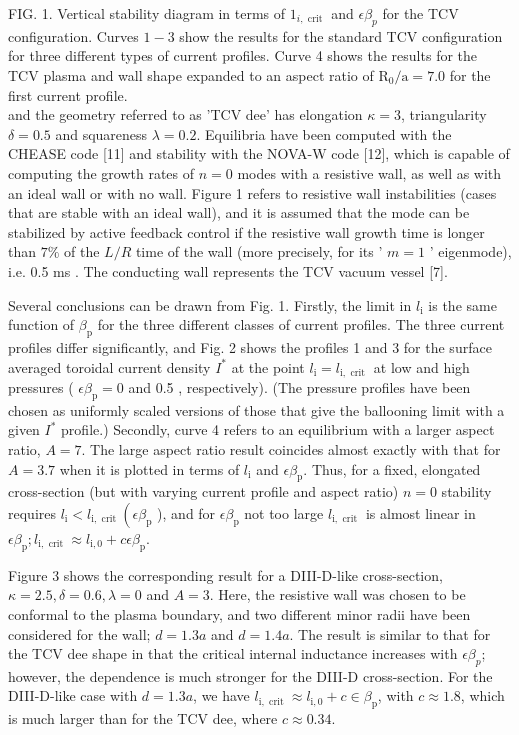 \documentclass[10pt]{article}
\begin{document}
FIG. 1. Vertical stability diagram in terms of $1_{i, \text { crit }}$ and $\epsilon \beta_{p}$ for the TCV configuration. Curves $1-3$ show the results for the standard TCV configuration for three different types of current profiles. Curve 4 shows the results for the TCV plasma and wall shape expanded to an aspect ratio of $\mathrm{R}_{0} / \mathrm{a}=7.0$ for the first current profile.\\
and the geometry referred to as 'TCV dee' has elongation $\kappa=3$, triangularity $\delta=0.5$ and squareness $\lambda=0.2$. Equilibria have been computed with the CHEASE code [11] and stability with the NOVA-W code [12], which is capable of computing the growth rates of $n=0$ modes with a resistive wall, as well as with an ideal wall or with no wall. Figure 1 refers to resistive wall instabilities (cases that are stable with an ideal wall), and it is assumed that the mode can be stabilized by active feedback control if the resistive wall growth time is longer than $7 \%$ of the $L / R$ time of the wall (more precisely, for its ' $m=1$ ' eigenmode), i.e. 0.5 ms . The conducting wall represents the TCV vacuum vessel [7].

Several conclusions can be drawn from Fig. 1. Firstly, the limit in $l_{\mathrm{i}}$ is the same function of $\beta_{\mathrm{p}}$ for the three different classes of current profiles. The three current profiles differ significantly, and Fig. 2 shows the profiles 1 and 3 for the surface averaged toroidal current density $I^{*}$ at the point $l_{\mathrm{i}}=l_{\mathrm{i}, \text { crit }}$ at low and high pressures ( $\epsilon \beta_{\mathrm{p}}=0$ and 0.5 , respectively). (The pressure profiles have been chosen as uniformly scaled versions of those that give the ballooning limit with a\\
given $I^{*}$ profile.) Secondly, curve 4 refers to an equilibrium with a larger aspect ratio, $A=7$. The large aspect ratio result coincides almost exactly with that for $A=3.7$ when it is plotted in terms of $l_{\mathrm{i}}$ and $\epsilon \beta_{\mathrm{p}}$. Thus, for a fixed, elongated cross-section (but with varying current profile and aspect ratio) $n=0$ stability requires $l_{\mathrm{i}}<l_{\mathrm{i}, \text { crit }}\left(\epsilon \beta_{\mathrm{p}}\right.$ ), and for $\epsilon \beta_{\mathrm{p}}$ not too large $l_{\mathrm{i}, \text { crit }}$ is almost linear in $\epsilon \beta_{\mathrm{p}} ; l_{\mathrm{i}, \text { crit }} \approx l_{\mathrm{i}, 0}+c \epsilon \beta_{\mathrm{p}}$.

Figure 3 shows the corresponding result for a DIII-D-like cross-section, $\kappa=2.5, \delta=0.6, \lambda=0$ and $A=3$. Here, the resistive wall was chosen to be conformal to the plasma boundary, and two different minor radii have been considered for the wall; $d=1.3 a$ and $d=1.4 a$. The result is similar to that for the TCV dee shape in that the critical internal inductance increases with $\epsilon \beta_{p}$; however, the dependence is much stronger for the DIII-D cross-section. For the DIII-D-like case with $d=1.3 a$, we have $l_{\mathrm{i}, \text { crit }} \approx l_{\mathrm{i}, 0}+c \in \beta_{\mathrm{p}}$, with $c \approx 1.8$, which is much larger than for the TCV dee, where $c \approx 0.34$.
\end{document}
